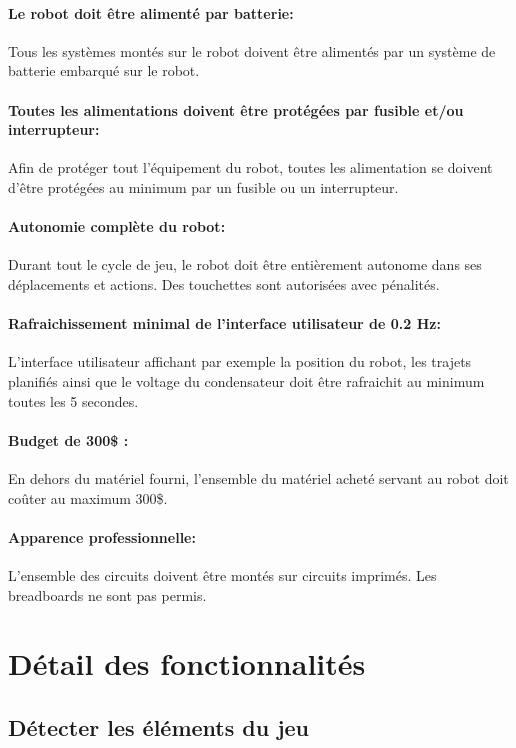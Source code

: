 \paragraph{Le robot doit être alimenté par batterie:}
Tous les systèmes montés sur le robot doivent être alimentés par un système de batterie embarqué sur le robot.

\paragraph{Toutes les alimentations doivent être protégées par fusible et/ou interrupteur:}
Afin de protéger tout l'équipement du robot, toutes les alimentation se doivent d'être protégées au minimum par un fusible ou un interrupteur.

\paragraph{Autonomie complète du robot:}
Durant tout le cycle de jeu, le robot doit être entièrement autonome dans ses déplacements et actions. Des touchettes sont autorisées avec pénalités.

\paragraph{Rafraichissement minimal de l'interface utilisateur de 0.2 Hz:}
L'interface utilisateur affichant par exemple la position du robot, les trajets planifiés ainsi que le voltage du condensateur doit être rafraichit au minimum toutes les 5 secondes.

\paragraph{Budget de 300\$ :}
En dehors du matériel fourni, l'ensemble du matériel acheté servant au robot doit coûter au maximum 300\$.

\paragraph{Apparence professionnelle:}
L'ensemble des circuits doivent être montés sur circuits imprimés. Les breadboards ne sont pas permis.

\section{Détail des fonctionnalités}

\subsection{Détecter les éléments du jeu}

